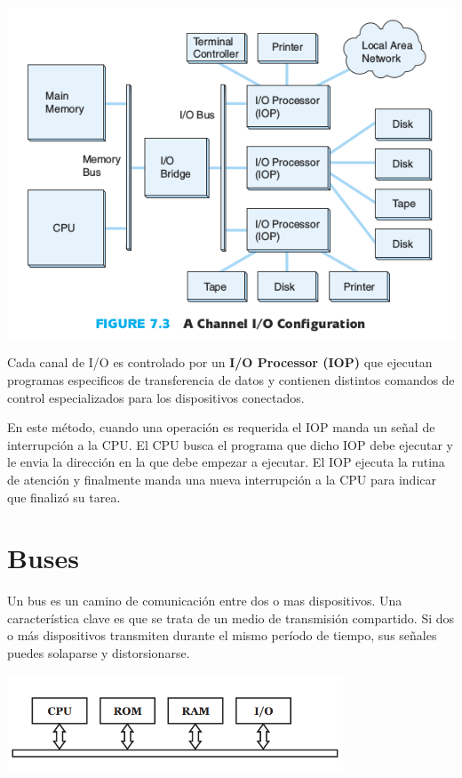 \begin{center}
	\includegraphics[width=15cm, keepaspectratio=yes]{imagenes/iochannel.png}
\end{center}

Cada canal de I/O es controlado por un \textbf{I/O Processor (IOP)} que ejecutan programas especificos de transferencia de datos y contienen distintos comandos de control especializados para los dispositivos conectados.

En este método, cuando una operación es requerida el IOP manda un señal de interrupción a la CPU. El CPU busca el programa que dicho IOP debe ejecutar y le envia la dirección en la que debe empezar a ejecutar. El IOP ejecuta la rutina de atención y finalmente manda una nueva interrupción a la CPU para indicar que finalizó su tarea.

\newpage

\newpage

\section{Buses}
Un bus es un camino de comunicación entre dos o mas dispositivos. Una característica clave es que se trata de un medio de transmisión compartido. Si dos o más dispositivos transmiten durante el mismo período de tiempo, sus señales puedes solaparse y distorsionarse.

\begin{center}
	\includegraphics[width=10cm, keepaspectratio=yes]{imagenes/bus.png}
\end{center}

